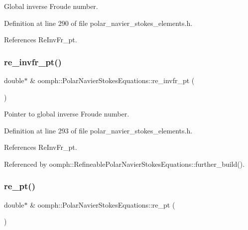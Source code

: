 Global inverse Froude number. 



Definition at line 290 of file polar\+\_\+navier\+\_\+stokes\+\_\+elements.\+h.



References Re\+Inv\+Fr\+\_\+pt.

\mbox{\label{classoomph_1_1PolarNavierStokesEquations_a82c26b8b7f30e36afda0e1ca5f335edb}} 
\subsubsection{\texorpdfstring{re\+\_\+invfr\+\_\+pt()}{re\_invfr\_pt()}}
{\footnotesize\ttfamily double$\ast$ \& oomph\+::\+Polar\+Navier\+Stokes\+Equations\+::re\+\_\+invfr\+\_\+pt (\begin{DoxyParamCaption}{ }\end{DoxyParamCaption})\hspace{0.3cm}{\ttfamily [inline]}}



Pointer to global inverse Froude number. 



Definition at line 293 of file polar\+\_\+navier\+\_\+stokes\+\_\+elements.\+h.



References Re\+Inv\+Fr\+\_\+pt.



Referenced by oomph\+::\+Refineable\+Polar\+Navier\+Stokes\+Equations\+::further\+\_\+build().

\mbox{\label{classoomph_1_1PolarNavierStokesEquations_a610a64f63c464c0bbf1a0bcf18cf2856}} 
\subsubsection{\texorpdfstring{re\+\_\+pt()}{re\_pt()}}
{\footnotesize\ttfamily double$\ast$ \& oomph\+::\+Polar\+Navier\+Stokes\+Equations\+::re\+\_\+pt (\begin{DoxyParamCaption}{ }\end{DoxyParamCaption})\hspace{0.3cm}{\ttfamily [inline]}}



